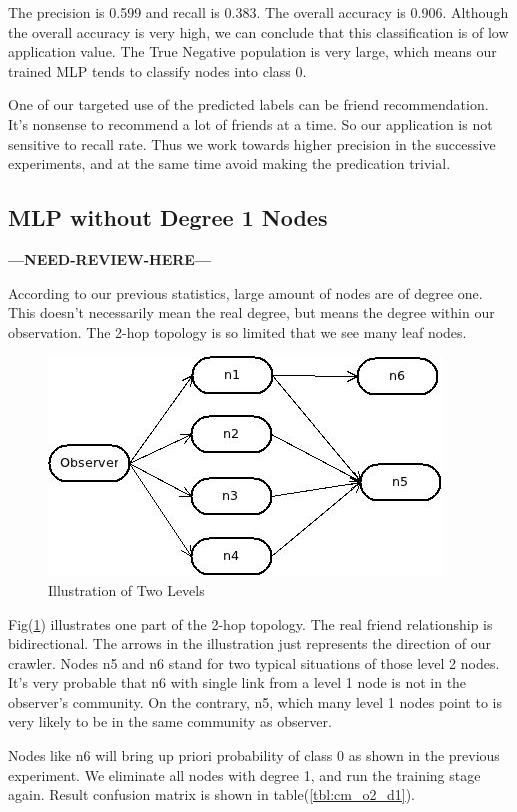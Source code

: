 \documentclass[11pt,a4paper]{article}
\newcommand{\question}{\textbf{---NEED-REVIEW-HERE---}}
\begin{document}
The precision is 0.599 and recall is 0.383. The overall accuracy 
is 0.906. Although the overall accuracy is very high, we can 
conclude that this classification is of low application value. 
The True Negative population is very large, which means our trained 
MLP tends to classify nodes into class 0. 

One of our targeted use of the predicted labels can be friend 
recommendation. It's nonsense to recommend a lot of friends 
at a time. So our application is not sensitive to recall rate. 
Thus we work towards higher precision in the successive experiments, 
and at the same time avoid making the predication trivial. 

\subsection{MLP without Degree 1 Nodes}

\question

According to our previous statistics, large amount of nodes
are of degree one. This doesn't necessarily mean the real 
degree, but means the degree within our observation. 
The 2-hop topology is so limited that we see many leaf nodes. 

\begin{figure}[htb]
	\centering
	\includegraphics[width=0.5\linewidth]{fig/illustration_2hop_level2.jpg}
	\caption{Illustration of Two Levels}
	\label{fig:illu_l2}
\end{figure}

Fig(\ref{fig:illu_l2}) illustrates one part of the 2-hop 
topology. The real friend relationship is bidirectional. 
The arrows in the illustration just represents the direction 
of our crawler. Nodes n5 and n6 stand for two typical situations 
of those level 2 nodes. It's very probable that n6 with single link 
from a level 1 node is not in the observer's community. 
On the contrary, n5, which many level 1 nodes point to is very likely
to be in the same community as observer. 

Nodes like n6 will bring up priori probability of class 0 as shown in 
the previous experiment. We eliminate all nodes with degree 1, and 
run the training stage again. Result confusion matrix is shown 
in table(\ref{tbl:cm_o2_d1}). 
\end{document}
